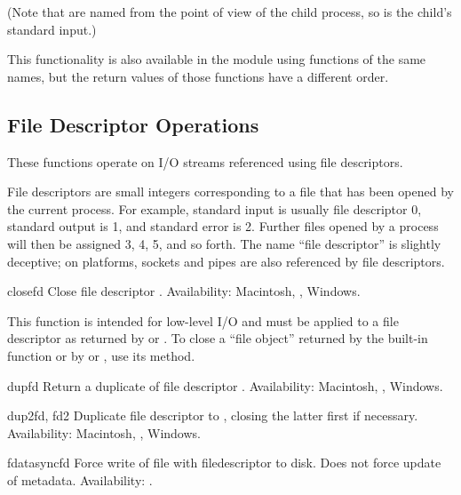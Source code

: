 (Note that  are named from the point of view of the child
process, so  is the child's standard input.)

This functionality is also available in the  module
using functions of the same names, but the return values of those
functions have a different order.


\subsection{File Descriptor Operations \label{os-fd-ops}}

These functions operate on I/O streams referenced using file
descriptors.  

File descriptors are small integers corresponding to a file that has
been opened by the current process.  For example, standard input is
usually file descriptor 0, standard output is 1, and standard error is
2.  Further files opened by a process will then be assigned 3, 4, 5,
and so forth.  The name ``file descriptor'' is slightly deceptive; on
{\UNIX} platforms, sockets and pipes are also referenced by file descriptors.


\begin{funcdesc}{close}{fd}
Close file descriptor .
Availability: Macintosh, \UNIX, Windows.

\begin{notice}
This function is intended for low-level I/O and must be applied
to a file descriptor as returned by  or
.  To close a ``file object'' returned by the
built-in function  or by  or
, use its  method.
\end{notice}
\end{funcdesc}

\begin{funcdesc}{dup}{fd}
Return a duplicate of file descriptor .
Availability: Macintosh, \UNIX, Windows.
\end{funcdesc}

\begin{funcdesc}{dup2}{fd, fd2}
Duplicate file descriptor  to , closing the latter
first if necessary.
Availability: Macintosh, \UNIX, Windows.
\end{funcdesc}

\begin{funcdesc}{fdatasync}{fd}
Force write of file with filedescriptor  to disk.
Does not force update of metadata.
Availability: \UNIX.
\end{funcdesc}

